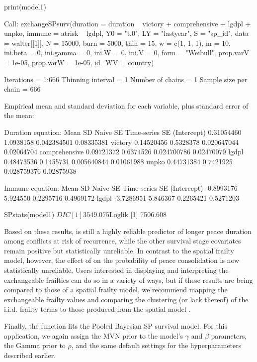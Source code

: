 \begin{example}
print(model1)

Call:
exchangeSPsurv(duration = duration ~ victory + comprehensive + 
    lgdpl + unpko, immune = atrisk ~ lgdpl, Y0 = "t.0", 
    LY = "lastyear", S = "sp_id", data = walter[[1]], 
    N = 15000, burn = 5000, thin = 15, w = c(1, 1, 1), m = 10, 
    ini.beta = 0, ini.gamma = 0, ini.W = 0, ini.V = 0, form = "Weibull", 
    prop.varV = 1e-05, prop.varW = 1e-05, id_WV = country)


Iterations = 1:666
Thinning interval = 1 
Number of chains = 1 
Sample size per chain = 666 

Empirical mean and standard deviation for each variable,
plus standard error of the mean:


Duration equation: 
                    Mean        SD    Naive SE Time-series SE
(Intercept)   0.31054460 1.0938158 0.042384501     0.08335381
victory       0.14520456 0.5328378 0.020647044     0.02064704
comprehensive 0.09721372 0.6374526 0.024700786     0.02470079
lgdpl         0.48473536 0.1455731 0.005640844     0.01061988
unpko         0.44731384 0.7421925 0.028759376     0.02875938

Immune equation: 
                  Mean       SD  Naive SE Time-series SE
(Intercept) -0.8993176 5.924550 0.2295716      0.4969172
lgdpl       -3.7286951 5.846367 0.2265421      0.5271203

SPstats(model1)
$DIC
[1] 3549.075

$Loglik
[1] 7506.608
\end{example}

\noindent Based on these results,  is still a highly reliable predictor of longer peace duration among conflicts at risk of recurrence, while the other survival stage covariates remain positive but statistically unreliable. In contrast to the spatial frailty model, however, the effect of  on the probability of peace consolidation is now statistically unreliable.  Users interested in displaying and interpreting the exchangeable frailties can do so in a variety of ways, but if these results are being compared to those of a spatial frailty model, we recommend mapping the exchangeable frailty values and comparing the clustering (or lack thereof) of the i.i.d. frailty terms to those produced from the spatial model \citep{darmofal2009bayesian}.

Finally, the  function fits the Pooled Bayesian SP survival model. For this application, we again assign the MVN prior to the model’s $\gamma$ and $\beta$ parameters, the Gamma prior to $\rho$, and the same default settings for the hyperparameters described earlier. 

